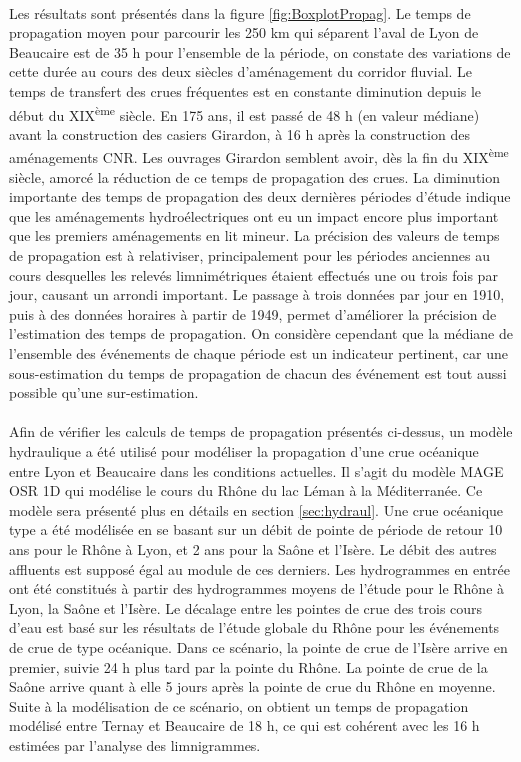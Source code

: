 	\paragraph{} Les résultats sont présentés dans la figure \ref{fig:BoxplotPropag}. Le temps de propagation moyen pour parcourir les 250 km qui séparent l'aval de Lyon de Beaucaire est de 35 h pour l'ensemble de la période, on constate des variations de cette durée au cours des deux siècles d'aménagement du corridor fluvial. Le temps de transfert des crues fréquentes est en constante diminution depuis le début du XIX\textsuperscript{ème} siècle. En 175 ans, il est passé de 48 h (en valeur médiane) avant la construction des casiers Girardon, à 16 h après la construction des aménagements CNR. Les ouvrages Girardon semblent avoir, dès la fin du XIX\textsuperscript{ème} siècle, amorcé la réduction de ce temps de propagation des crues. La diminution importante des temps de propagation des deux dernières périodes d'étude indique que les aménagements hydroélectriques ont eu un impact encore plus important que les premiers aménagements en lit mineur. La précision des valeurs de temps de propagation est à relativiser, principalement pour les périodes anciennes au cours desquelles les relevés limnimétriques étaient effectués une ou trois fois par jour, causant un arrondi important. Le passage à trois données par jour en 1910, puis à des données horaires à partir de 1949, permet d'améliorer la précision de l'estimation des temps de propagation. On considère cependant que la médiane de l'ensemble des événements de chaque période est un indicateur pertinent, car une sous-estimation du temps de propagation de chacun des événement est tout aussi possible qu'une sur-estimation. 
	
	\paragraph{} Afin de vérifier les calculs de temps de propagation présentés ci-dessus, un modèle hydraulique a été utilisé pour modéliser la propagation d'une crue océanique entre Lyon et Beaucaire dans les conditions actuelles. Il s'agit du modèle MAGE OSR 1D qui modélise le cours du Rhône du lac Léman à la Méditerranée. Ce modèle sera présenté plus en détails en section \ref{sec:hydraul}. Une crue océanique type a été modélisée en se basant sur un débit de pointe de période de retour 10 ans pour le Rhône à Lyon, et 2 ans pour la Saône et l'Isère. Le débit des autres affluents est supposé égal au module de ces derniers. Les hydrogrammes en entrée ont été constitués à partir des hydrogrammes moyens de l'étude \citet{bard_actualisation_2018} pour le Rhône à Lyon, la Saône et l'Isère. Le décalage entre les pointes de crue des trois cours d'eau est basé sur les résultats de l'étude globale du Rhône \citep{rigaudiere_etude_2000} pour les événements de crue de type océanique. Dans ce scénario, la pointe de crue de l'Isère arrive en premier, suivie 24 h plus tard par la pointe du Rhône. La pointe de crue de la Saône arrive quant à elle 5 jours après la pointe de crue du Rhône en moyenne. Suite à la modélisation de ce scénario, on obtient un temps de propagation modélisé entre Ternay et Beaucaire de 18 h, ce qui est cohérent avec les 16 h estimées par l'analyse des limnigrammes. 

